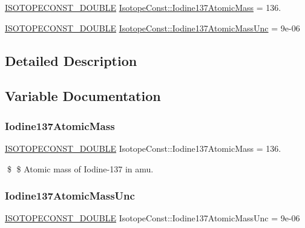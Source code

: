 \begin{DoxyCompactItemize}
\item 
\mbox{\hyperlink{group___isotope_const-_macros_ga8f45a7272ce02c0b4c65c44636ed719a}{I\+S\+O\+T\+O\+P\+E\+C\+O\+N\+S\+T\+\_\+\+D\+O\+U\+B\+LE}} \mbox{\hyperlink{group___isotope_const-_iodine-_i137_ga939e5c08581da0536a1ba96cfe13019b}{Isotope\+Const\+::\+Iodine137\+Atomic\+Mass}} = 136.
\item 
\mbox{\hyperlink{group___isotope_const-_macros_ga8f45a7272ce02c0b4c65c44636ed719a}{I\+S\+O\+T\+O\+P\+E\+C\+O\+N\+S\+T\+\_\+\+D\+O\+U\+B\+LE}} \mbox{\hyperlink{group___isotope_const-_iodine-_i137_gad236d2b7963796c48f0b5fdcbca9b9e8}{Isotope\+Const\+::\+Iodine137\+Atomic\+Mass\+Unc}} = 9e-\/06
\end{DoxyCompactItemize}


\subsection{Detailed Description}


\subsection{Variable Documentation}
\mbox{\label{group___isotope_const-_iodine-_i137_ga939e5c08581da0536a1ba96cfe13019b}} 
\subsubsection{\texorpdfstring{Iodine137\+Atomic\+Mass}{Iodine137AtomicMass}}
{\footnotesize\ttfamily \mbox{\hyperlink{group___isotope_const-_macros_ga8f45a7272ce02c0b4c65c44636ed719a}{I\+S\+O\+T\+O\+P\+E\+C\+O\+N\+S\+T\+\_\+\+D\+O\+U\+B\+LE}} Isotope\+Const\+::\+Iodine137\+Atomic\+Mass = 136.}

\$ \$ Atomic mass of Iodine-\/137 in amu. \mbox{\label{group___isotope_const-_iodine-_i137_gad236d2b7963796c48f0b5fdcbca9b9e8}} 
\subsubsection{\texorpdfstring{Iodine137\+Atomic\+Mass\+Unc}{Iodine137AtomicMassUnc}}
{\footnotesize\ttfamily \mbox{\hyperlink{group___isotope_const-_macros_ga8f45a7272ce02c0b4c65c44636ed719a}{I\+S\+O\+T\+O\+P\+E\+C\+O\+N\+S\+T\+\_\+\+D\+O\+U\+B\+LE}} Isotope\+Const\+::\+Iodine137\+Atomic\+Mass\+Unc = 9e-\/06}


